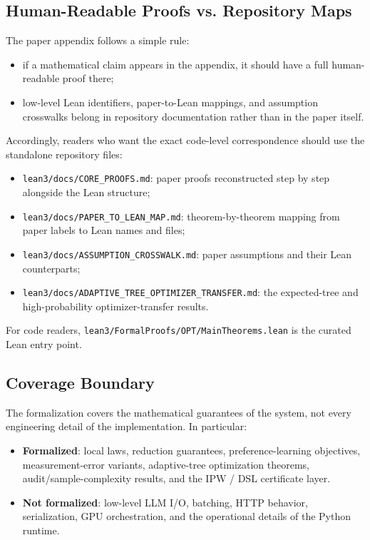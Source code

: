 \subsection{Human-Readable Proofs vs. Repository Maps}

The paper appendix follows a simple rule:
\begin{itemize}[nosep]
    \item if a mathematical claim appears in the appendix, it should have a full human-readable proof there;
    \item low-level Lean identifiers, paper-to-Lean mappings, and assumption crosswalks belong in repository documentation rather than in the paper itself.
\end{itemize}

Accordingly, readers who want the exact code-level correspondence should use the
standalone repository files:
\begin{itemize}[nosep]
    \item \texttt{lean3/docs/CORE\_PROOFS.md}: paper proofs reconstructed step by step alongside the Lean structure;
    \item \texttt{lean3/docs/PAPER\_TO\_LEAN\_MAP.md}: theorem-by-theorem mapping from paper labels to Lean names and files;
    \item \texttt{lean3/docs/ASSUMPTION\_CROSSWALK.md}: paper assumptions and their Lean counterparts;
    \item \texttt{lean3/docs/ADAPTIVE\_TREE\_OPTIMIZER\_TRANSFER.md}: the expected-tree and high-probability optimizer-transfer results.
\end{itemize}

For code readers, \texttt{lean3/FormalProofs/OPT/MainTheorems.lean} is the
curated Lean entry point.

\subsection{Coverage Boundary}

The formalization covers the mathematical guarantees of the system, not every
engineering detail of the implementation. In particular:
\begin{itemize}[nosep]
    \item \textbf{Formalized}: local laws, reduction guarantees, preference-learning objectives, measurement-error variants, adaptive-tree optimization theorems, audit/sample-complexity results, and the IPW / DSL certificate layer.
    \item \textbf{Not formalized}: low-level LLM I/O, batching, HTTP behavior, serialization, GPU orchestration, and the operational details of the Python runtime.
\end{itemize}

